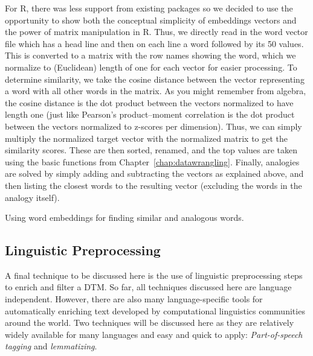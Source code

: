 For R, there was less support from existing packages so we decided to use the opportunity to show both the conceptual simplicity of embeddings vectors and the power of matrix manipulation in R.
Thus, we directly read in the word vector file which has a head line and then on each line a word followed by its 50 values.
This is converted to a matrix with the row names showing the word,
which we normalize to (Euclidean) length of one for each vector for easier processing.
To determine similarity, we take the cosine distance between the vector representing a word with all other words in the matrix.
As you might remember from algebra, the cosine distance is the dot product between the vectors normalized to have length one
(just like Pearson's product--moment correlation is the dot product between the vectors normalized to z-scores per dimension).
Thus, we can simply multiply the normalized target vector with the normalized matrix to get the similarity scores.
These are then sorted, renamed, and the top values are taken using the basic functions from Chapter~\ref{chap:datawrangling}.
Finally, analogies are solved by simply adding and subtracting the vectors as explained above, and then listing the closest words to the resulting vector
(excluding the words in the analogy itself).

\begin{ccsexample}
\caption{Using word embeddings for finding similar and analogous words.}\label{ex:embedding}
\end{ccsexample}





\subsection{Linguistic Preprocessing}
\label{sec:nlp}

A final technique to be discussed here is the use of linguistic preprocessing steps to enrich and filter a DTM.
So far, all techniques discussed here are language independent.
However, there are also many language-specific tools for automatically enriching text developed by computational linguistics communities around the world.
Two techniques will be discussed here as they are relatively widely available for many languages and easy and quick to apply: \emph{Part-of-speech tagging} and \emph{lemmatizing}.

